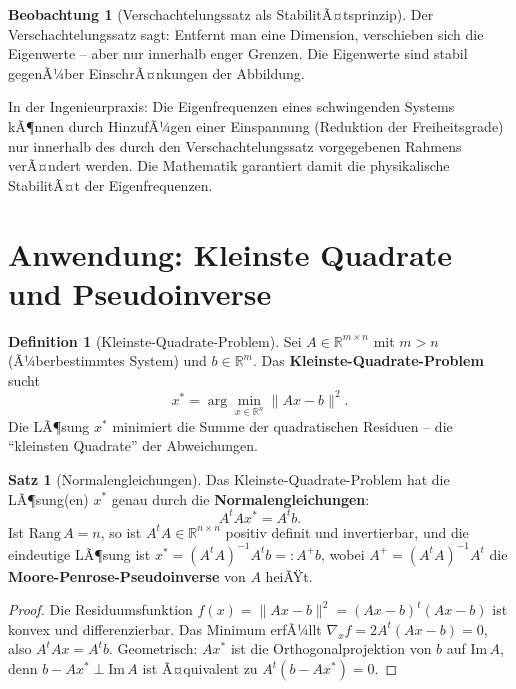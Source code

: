﻿\documentclass[a4paper,12pt]{report}
\theoremstyle{definition}
\newtheorem{definition}{Definition}
\newtheorem{satz}{Satz}
\newtheorem{beobachtung}{Beobachtung}
\begin{document}
\begin{beobachtung}[Verschachtelungssatz als StabilitÃ¤tsprinzip]
    Der Verschachtelungssatz sagt: Entfernt man eine Dimension,
    verschieben sich die Eigenwerte -- aber nur innerhalb enger Grenzen.
    Die Eigenwerte sind stabil gegenÃ¼ber EinschrÃ¤nkungen der Abbildung.

    In der Ingenieurpraxis: Die Eigenfrequenzen eines schwingenden Systems
    kÃ¶nnen durch HinzufÃ¼gen einer Einspannung (Reduktion der Freiheitsgrade)
    nur innerhalb des durch den Verschachtelungssatz vorgegebenen Rahmens
    verÃ¤ndert werden. Die Mathematik garantiert damit die physikalische
    StabilitÃ¤t der Eigenfrequenzen.
\end{beobachtung}


\section{Anwendung: Kleinste Quadrate und Pseudoinverse}

\begin{definition}[Kleinste-Quadrate-Problem]
    Sei $A \in \mathbb{R}^{m \times n}$ mit $m > n$ (Ã¼berbestimmtes System)
    und $b \in \mathbb{R}^m$. Das \textbf{Kleinste-Quadrate-Problem} sucht
    \[
        x^* = \arg\min_{x \in \mathbb{R}^n} \|Ax - b\|^2.
    \]
    Die LÃ¶sung $x^*$ minimiert die Summe der quadratischen Residuen --
    die ``kleinsten Quadrate'' der Abweichungen.
\end{definition}

\begin{satz}[Normalengleichungen]
    Das Kleinste-Quadrate-Problem hat die LÃ¶sung(en) $x^*$ genau durch
    die \textbf{Normalengleichungen}:
    \[
        A^t A x^* = A^t b.
    \]
    Ist $\mathrm{Rang}\,A = n$, so ist $A^t A \in \mathbb{R}^{n \times n}$
    positiv definit und invertierbar, und die eindeutige LÃ¶sung ist
    $x^* = (A^t A)^{-1} A^t b =: A^+ b$, wobei $A^+ = (A^t A)^{-1} A^t$
    die \textbf{Moore-Penrose-Pseudoinverse} von $A$ heiÃŸt.
\end{satz}
\begin{proof}
    Die Residuumsfunktion $f(x) = \|Ax - b\|^2 = (Ax-b)^t(Ax-b)$
    ist konvex und differenzierbar. Das Minimum erfÃ¼llt
    $\nabla_x f = 2A^t(Ax - b) = 0$, also $A^t A x = A^t b$.
    Geometrisch: $Ax^*$ ist die Orthogonalprojektion von $b$ auf
    $\mathrm{Im}\,A$, denn $b - Ax^* \perp \mathrm{Im}\,A$
    ist Ã¤quivalent zu $A^t(b - Ax^*) = 0$.
\end{proof}
\end{document}
